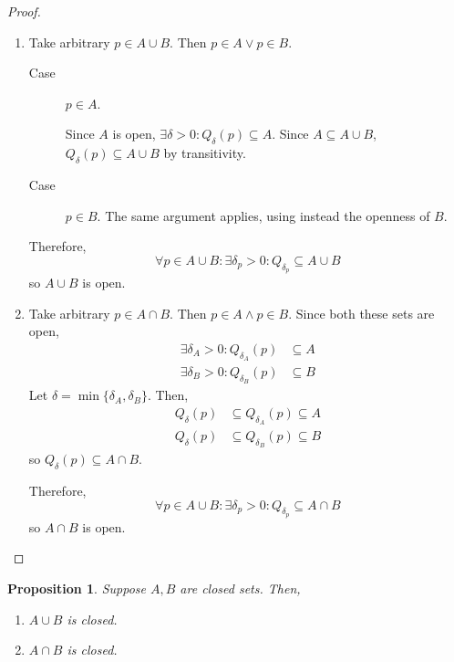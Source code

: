 \documentclass[letterpaper,11pt]{article}
\newtheorem{prop}{Proposition}
\newcommand{\union}{\cup}
\newcommand{\intersn}{\cap}
\begin{document}
\begin{proof}
  ~

  \begin{enumerate}
    \item
      Take arbitrary $p \in A \union B$. Then $p \in A \lor p \in B$.
      \begin{description}
        \item[Case] $p \in A$.

          Since $A$ is open, $\exists \delta > 0 : Q_\delta(p) \subseteq A$.
          Since $A \subseteq A \union B$, $Q_\delta(p) \subseteq A \union B$ by
          transitivity.

        \item[Case] $p \in B$. The same argument applies, using instead the
          openness of $B$.
      \end{description}

      Therefore,
      \begin{equation*}
        \forall p \in A \union B:
        \exists \delta_p > 0:
        Q_{\delta_p} \subseteq A \union B
      \end{equation*}
      so $A \union B$ is open.

    \item
      Take arbitrary $p \in A \intersn B$. Then $p \in A \land p \in B$. Since
      both these sets are open,
      \begin{align*}
        \exists \delta_A > 0 : Q_{\delta_A}(p) &\subseteq A \\
        \exists \delta_B > 0 : Q_{\delta_B}(p) &\subseteq B
      \end{align*}
      Let $\delta = \min\{\delta_A, \delta_B\}$. Then,
      \begin{align*}
        Q_\delta(p) &\subseteq Q_{\delta_A}(p) \subseteq A \\
        Q_\delta(p) &\subseteq Q_{\delta_B}(p) \subseteq B
      \end{align*}
      so $Q_\delta(p) \subseteq A \intersn B$.

      Therefore,
      \begin{equation*}
        \forall p \in A \union B:
        \exists \delta_p > 0:
        Q_{\delta_p} \subseteq A \intersn B
      \end{equation*}
      so $A \intersn B$ is open.
  \end{enumerate}
\end{proof}

\begin{prop}
  Suppose $A, B$ are closed sets. Then,
  \begin{enumerate}
    \item
      $A \union B$ is closed.

    \item
      $A \intersn B$ is closed.
  \end{enumerate}
\end{prop}
\end{document}
